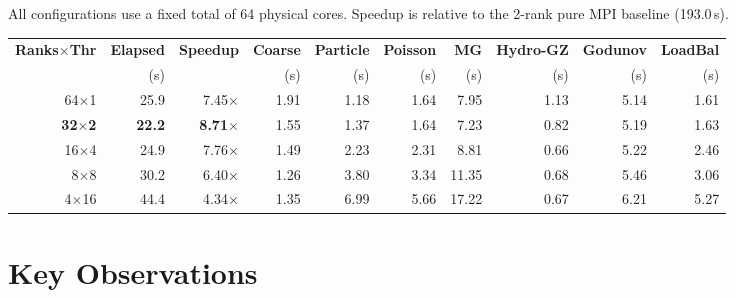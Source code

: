 \documentclass[11pt,fleqn]{book}
\begin{document}
All configurations use a fixed total of 64 physical cores.  Speedup is relative to the 2-rank pure MPI baseline (193.0\,s).

\begin{center}
\begin{tabular}{rrrrrrrrrr}
\toprule
\textbf{Ranks$\times$Thr} & \textbf{Elapsed} & \textbf{Speedup} & \textbf{Coarse} & \textbf{Particle} & \textbf{Poisson} & \textbf{MG} & \textbf{Hydro-GZ} & \textbf{Godunov} & \textbf{LoadBal} \\
 & (s) & & (s) & (s) & (s) & (s) & (s) & (s) & (s) \\
\midrule
64$\times$1  & 25.9 & 7.45$\times$ & 1.91 & 1.18 & 1.64 & 7.95  & 1.13 & 5.14 & 1.61 \\
\textbf{32$\times$2}  & \textbf{22.2} & \textbf{8.71$\times$} & 1.55 & 1.37 & 1.64 & 7.23  & 0.82 & 5.19 & 1.63 \\
16$\times$4  & 24.9 & 7.76$\times$ & 1.49 & 2.23 & 2.31 & 8.81  & 0.66 & 5.22 & 2.46 \\
8$\times$8   & 30.2 & 6.40$\times$ & 1.26 & 3.80 & 3.34 & 11.35 & 0.68 & 5.46 & 3.06 \\
4$\times$16  & 44.4 & 4.34$\times$ & 1.35 & 6.99 & 5.66 & 17.22 & 0.67 & 6.21 & 5.27 \\
\bottomrule
\end{tabular}
\end{center}

\section{Key Observations}
\end{document}
